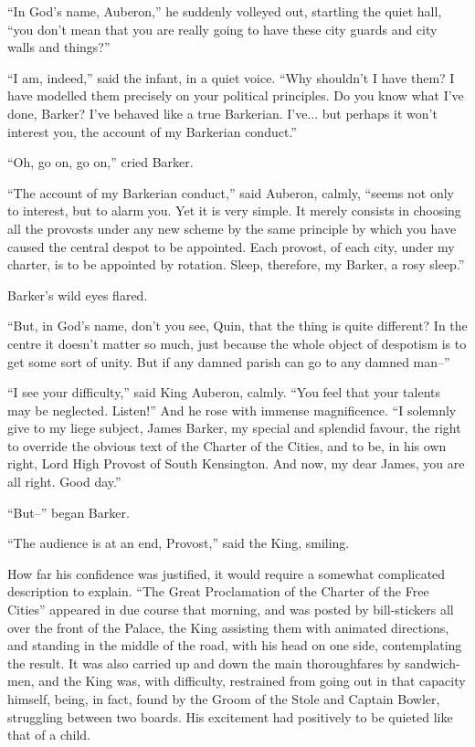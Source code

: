 \documentclass{book}
\begin{document}
“In God’s name, Auberon,” he suddenly volleyed out, startling the quiet hall, “you don’t mean that you are really going to have these city guards and city walls and things?”

“I am, indeed,” said the infant, in a quiet voice. “Why shouldn’t I have them? I have modelled them precisely on your political principles. Do you know what I’ve done, Barker? I’ve behaved like a true Barkerian. I’ve... but perhaps it won’t interest you, the account of my Barkerian conduct.”

“Oh, go on, go on,” cried Barker.

“The account of my Barkerian conduct,” said Auberon, calmly, “seems not only to interest, but to alarm you. Yet it is very simple. It merely consists in choosing all the provosts under any new scheme by the same principle by which you have caused the central despot to be appointed. Each provost, of each city, under my charter, is to be appointed by rotation. Sleep, therefore, my Barker, a rosy sleep.”

Barker’s wild eyes flared.

“But, in God’s name, don’t you see, Quin, that the thing is quite different? In the centre it doesn’t matter so much, just because the whole object of despotism is to get some sort of unity. But if any damned parish can go to any damned man–”

“I see your difficulty,” said King Auberon, calmly. “You feel that your talents may be neglected. Listen!” And he rose with immense magnificence. “I solemnly give to my liege subject, James Barker, my special and splendid favour, the right to override the obvious text of the Charter of the Cities, and to be, in his own right, Lord High Provost of South Kensington. And now, my dear James, you are all right. Good day.”

“But–” began Barker.

“The audience is at an end, Provost,” said the King, smiling.

How far his confidence was justified, it would require a somewhat complicated description to explain. “The Great Proclamation of the Charter of the Free Cities” appeared in due course that morning, and was posted by bill-stickers all over the front of the Palace, the King assisting them with animated directions, and standing in the middle of the road, with his head on one side, contemplating the result. It was also carried up and down the main thoroughfares by sandwich-men, and the King was, with difficulty, restrained from going out in that capacity himself, being, in fact, found by the Groom of the Stole and Captain Bowler, struggling between two boards. His excitement had positively to be quieted like that of a child.
\end{document}
